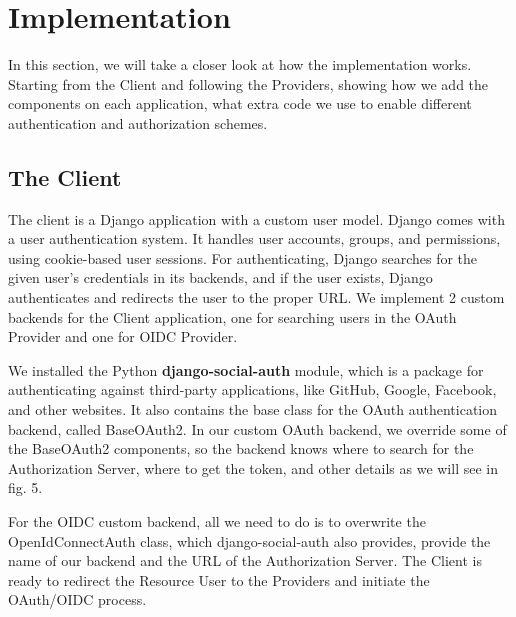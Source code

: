 \section{Implementation}

In this section, we will take a closer look at how the implementation works. Starting from the Client and following the Providers, showing how we add the components on each application, what extra code we use to enable different authentication and authorization schemes. 


\subsection{The Client}

The client is a Django application with a custom user model. Django comes with a user authentication system. It handles user accounts, groups, and permissions, using cookie-based user sessions. For authenticating, Django searches for the given user's credentials in its backends, and if the user exists, Django authenticates and redirects the user to the proper URL. We implement 2 custom backends for the Client application, one for searching users in the OAuth Provider and one for OIDC Provider.

We installed the Python \textbf{django-social-auth} \cite{djangosocial} module, which is a package for authenticating against third-party applications, like GitHub, Google, Facebook, and other websites. It also contains the base class for the OAuth authentication backend, called BaseOAuth2. In our custom OAuth backend, we override some of the BaseOAuth2 components, so the backend knows where to search for the Authorization Server, where to get the token, and other details as we will see in fig. 5.

For the OIDC custom backend, all we need to do is to overwrite the OpenIdConnectAuth class, which django-social-auth also provides, provide the name of our backend and the URL of the Authorization Server. The Client is ready to redirect the Resource User to the Providers and initiate the OAuth/OIDC process.


